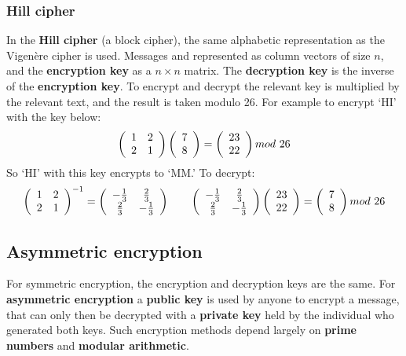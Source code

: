 \documentclass{article}
\begin{document}
\subsubsection{Hill cipher}
In the \textbf{Hill cipher} (a block cipher), the same alphabetic representation as the Vigen\`{e}re cipher is used. Messages and represented as column vectors of size $ n $, and the \textbf{encryption key} as a $ n \times n $ matrix. The \textbf{decryption key} is the inverse of the \textbf{encryption key}. To encrypt and decrypt the relevant key is multiplied by the relevant text, and the result is taken modulo 26. For example to encrypt `HI' with the key below:
\[
	\left(
	\begin{array}{c c}
		1 & 2 \\
		2 & 1
	\end{array}
	\right)
	\left(
	\begin{array}{c}
		7 \\
		8
	\end{array}
	\right)
	=
	\left(
	\begin{array}{c}
		23 \\
		22
	\end{array}
	\right)
	mod\ 26
\]
So `HI' with this key encrypts to `MM.' To decrypt:
\[
	\left(
	\begin{array}{c c}
		1 & 2 \\
		2 & 1
	\end{array}
	\right)^{-1}
	=
	\left(
	\begin{array}{c c}
		-\frac{1}{3} & \frac{2}{3} \\
		\frac{2}{3} & -\frac{1}{3}
	\end{array}
	\right)
	\hspace{20pt}
	\left(
	\begin{array}{c c}
		-\frac{1}{3} & \frac{2}{3} \\
		\frac{2}{3} & -\frac{1}{3}
	\end{array}
	\right)
	\left(
	\begin{array}{c}
		23 \\
		22
	\end{array}
	\right)
	=
	\left(
	\begin{array}{c}
		7 \\
		8
	\end{array}
	\right)
	mod\ 26
\]

\subsection{Asymmetric encryption}
For symmetric encryption, the encryption and decryption keys are the same. For \textbf{asymmetric encryption} a \textbf{public key} is used by anyone to encrypt a message, that can only then be decrypted with a \textbf{private key} held by the individual who generated both keys. Such encryption methods depend largely on \textbf{prime numbers} and \textbf{modular arithmetic}.
\end{document}
